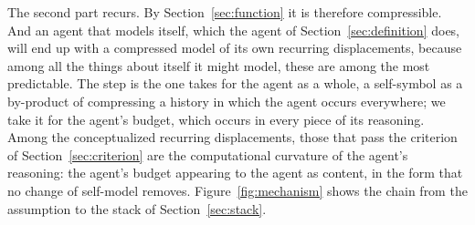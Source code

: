 The second part recurs. By Section~\ref{sec:function} it is therefore compressible. And an agent that
models itself, which the agent of Section~\ref{sec:definition} does, will end up with a compressed
model of its own recurring displacements, because among all the things about itself it might model,
these are among the most predictable. The step is the one \citet{schmidhuber2010} takes for the agent
as a whole, a self-symbol as a by-product of compressing a history in which the agent occurs
everywhere; we take it for the agent's budget, which occurs in every piece of its reasoning. Among the conceptualized recurring displacements, those that pass
the criterion of Section~\ref{sec:criterion} are the computational curvature of the agent's reasoning:
the agent's budget appearing to the agent as content, in the form that no change of self-model removes.
Figure~\ref{fig:mechanism} shows the chain from the assumption to the stack of Section~\ref{sec:stack}.

